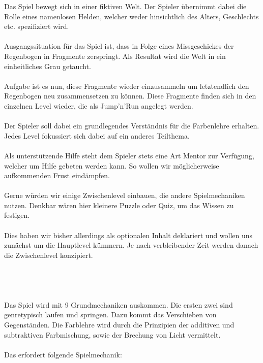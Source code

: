 \documentclass[10pt,a4paper,notitlepage]{report}
\begin{document}
		Das Spiel bewegt sich in einer fiktiven Welt. Der Spieler übernimmt dabei die Rolle eines namenlosen Helden, 
	welcher weder hinsichtlich des Alters, Geschlechts etc. spezifiziert wird.\\\\
	Ausgangssituation für das Spiel ist, dass in Folge eines Missgeschickes der Regenbogen in Fragmente zerspringt.
	Als Resultat wird die Welt in ein einheitliches Grau getaucht.\\\\
	Aufgabe ist es nun, diese Fragmente wieder einzusammeln um letztendlich den Regenbogen neu zusammensetzen zu können. 
	Diese Fragmente finden sich in den einzelnen Level wieder, die als Jump'n'Run angelegt werden.\\\\
	Der Spieler soll dabei ein grundlegendes Verständnis für die Farbenlehre erhalten. Jedes Level fokussiert sich dabei auf ein anderes Teilthema.\\\\
	Als unterstützende Hilfe steht dem Spieler stets eine Art Mentor zur Verfügung, welcher um Hilfe gebeten werden kann. 
	So wollen wir möglicherweise aufkommenden Frust eindämpfen.\\\\
	Gerne würden wir einige Zwischenlevel einbauen, die andere Spielmechaniken nutzen. 
	Denkbar wären hier kleinere Puzzle oder Quiz, um das Wissen zu festigen. \\\\
	Dies haben wir bisher allerdings als optionalen Inhalt deklariert und wollen uns zunächst um die Hauptlevel kümmern. 
	Je nach verbleibender Zeit werden danach die Zwischenlevel konzipiert.
	\\
	\\
	\clearpage\
	\\
	\\
	\\
	\Text
		Das Spiel wird mit 9 Grundmechaniken auskommen. Die ersten zwei sind genretypisch laufen und springen. 
	Dazu kommt das Verschieben von Gegenständen. Die Farblehre wird durch die Prinzipien der additiven und subtraktiven Farbmischung, 
	sowie der Brechung von Licht vermittelt.\\
	\\
	Das erfordert folgende Spielmechanik:\\
\end{document}
